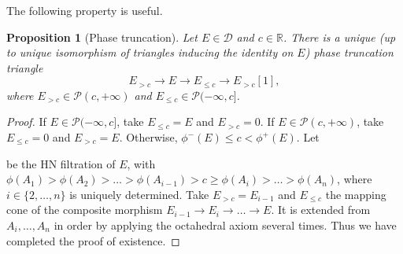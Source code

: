 \documentclass[a4paper,12pt]{amsart}
\numberwithin{equation}{section}
\newtheorem{proposition}[theorem]{Proposition}
\newcommand{\1}{\mathbf{1}}
\begin{document}
The following property is useful.
\begin{proposition}[Phase truncation]\label{phase truncation}
    Let $E\in\mathcal{D}$ and $c\in\mathbb{R}$. There is a unique (up to unique isomorphism of triangles inducing the identity on $E$) \emph{phase truncation triangle}
    \[E_{>c}\rightarrow E\rightarrow E_{\leqslant c}\rightarrow E_{>c}[1],\]
    where $E_{>c}\in\mathcal{P}(c,+\infty)$ and $E_{\leqslant c}\in\mathcal{P}(-\infty,c]$.
\end{proposition}
\begin{proof}
    If $E\in\mathcal{P}(-\infty,c]$, take $E_{\leqslant c}=E$ and $E_{>c}=0$. If $E\in\mathcal{P}(c,+\infty)$, take $E_{\leqslant c}=0$ and $E_{>c}=E$. Otherwise, $\phi^-(E)\leqslant c<\phi^+(E)$. Let
    \begin{center}
        \end{center}
        be the HN filtration of $E$, with $\phi(A_1)>\phi(A_2)>\dots>\phi(A_{i-1})>c\geqslant\phi(A_i)>\dots>\phi(A_n)$, where $i\in\{2,\dots,n\}$ is uniquely determined. Take $E_{>c}=E_{i-1}$ and $E_{\leqslant c}$ the mapping cone of the composite morphism $E_{i-1}\rightarrow E_i\rightarrow\dots\rightarrow E$. It is extended from $A_i,\dots,A_n$ in order by applying the octahedral axiom several times. Thus we have completed the proof of existence.


\end{proof}
\end{document}
